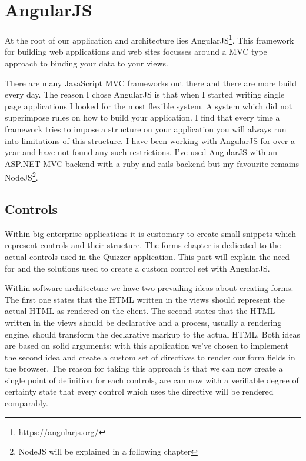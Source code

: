 


\section{AngularJS}
At the root of our application and architecture lies AngularJS\footnote{https://angularjs.org/}. This framework for building web applications and web sites focusses around a MVC type approach to binding your data to your views. 

There are many JavaScript MVC frameworks out there and there are more build every day. The reason I chose AngularJS is that when I started writing single page applications I looked for the most flexible system. A system which did not superimpose rules on how to build your application. I find that every time a framework tries to impose a structure on your application you will always run into limitations of this structure. I have been working with AngularJS for over a year and have not found any such restrictions. I’ve used AngularJS with an ASP.NET MVC backend with a ruby and rails backend but my favourite remains NodeJS\footnote{NodeJS will be explained in a following chapter}. 

\subsection{Controls}
Within big enterprise applications it is customary to create small snippets which represent controls and their structure. The forms chapter is dedicated to the actual controls used in the Quizzer application. This part will explain the need for and the solutions used to create a custom control set with AngularJS.

Within software architecture we have two prevailing ideas about creating forms. The first one states that the HTML written in the views should represent the actual HTML as rendered on the client. The second states that the HTML written in the views should be declarative and a process, usually a rendering engine, should transform the declarative markup to the actual HTML. Both ideas are based on solid arguments; with this application we've chosen to implement the second idea and create a custom set of directives to render our form fields in the browser. The reason for taking this approach is that we can now create a single point of definition for each controls, are can now with a verifiable degree of certainty state that every control which uses the directive will be rendered comparably. 

\pagebreak